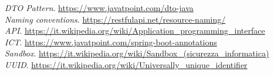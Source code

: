 \smallskip %
\textit{DTO Pattern}. \url{https://www.javatpoint.com/dto-java}\\
\smallskip %
\textit{Naming conventions}. \url{https://restfulapi.net/resource-naming/}\\
\smallskip %
\textit{API}. \url{https://it.wikipedia.org/wiki/Application\_programming\_interface}\\
\smallskip
\textit{ICT}. \url{https://www.javatpoint.com/spring-boot-annotations}\\
\smallskip
\textit{Sandbox}. \url{https://it.wikipedia.org/wiki/Sandbox\_(sicurezza\_informatica)}\\
\smallskip
\textit{UUID}. \url{https://it.wikipedia.org/wiki/Universally\_unique\_identifier}